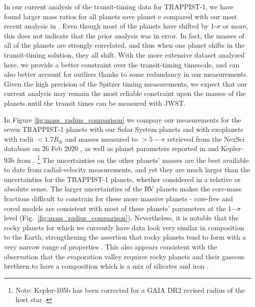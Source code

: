 \documentclass[twocolumn]{aastex63}
\begin{document}
In our current analysis of the transit-timing data
for TRAPPIST-1, we have found larger mass ratios for
all planets save planet e compared with our most
recent analysis in \citet{Grimm2018}.  Even though
most of the planets have shifted by 1-$\sigma$ or more,
this does not indicate that the prior analysis was in
error.  In fact, the masses of all of the planets
are strongly correlated, and thus when one planet shifts
in the transit-timing solution, they all shift.  With
the more extensive dataset analyzed here, we provide
a better constraint over the transit-timing timescale,
and can also better account for outliers thanks to some
redundancy in our measurements. Given the high precision of
the Spitzer timing measurements, we expect that our current 
analysis may remain the most reliable constraint upon the 
masses of the planets until the transit times can be measured 
with JWST.




In Figure \ref{fig:mass_radius_comparison} we compare our measurements for
the seven TRAPPIST-1 planets with our Solar System planets and with exoplanets
with radii ${<}1.7 R_\oplus$ and masses measured to ${>}5-\sigma$ retrieved from
the NexSci database on 26 Feb 2020 \citep{Akeson2013,Christiansen2018}, as well
as planet parameters reported in \citet{Dai2019} and Kepler-93b from \citet{Dressing2015}.
\footnote{Note: Kepler-105b has been corrected for a GAIA DR2 revised radius of
    the host star \citep{Berger2018,Fulton2018}.}   The uncertainties
on the other planets' masses are the best available to date from radial-velocity measurements, and yet they are much larger than the uncertainties for the TRAPPIST-1 planets, whether considered in
a relative or absolute sense.  The larger uncertainties of the RV planets makes the core-mass fractions difficult to constrain
for these more massive planets - core-free and cored models are consistent with most of these planets' parameters at the 1$-\sigma$ level (Fig.\ \ref{fig:mass_radius_comparison}).   Nevertheless, it is notable that the
rocky planets for which we currently have data look very similar in composition to the
Earth, strengthening the assertion that rocky planets tend to form with a very
narrow range of properties \citep{Dressing2015}.
This also appears consistent with the observation
that the evaporation valley requires rocky planets and their gaseous brethren to have 
a composition which is a mix of silicates and iron \citep{Owen2017}.
\end{document}
